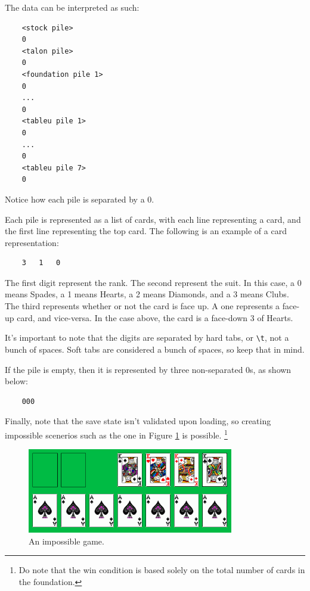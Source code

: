 \documentclass[12pt,a4paper,titlepage]{article}
\begin{document}
	The data can be interpreted as such:
	\begin{verbatim}
	<stock pile>
	0
	<talon pile>
	0
	<foundation pile 1>
	0
	...
	0
	<tableu pile 1>
	0
	...
	0
	<tableu pile 7>
	0
	\end{verbatim}
	Notice how each pile is separated by a 0.

	Each pile is represented as a list of cards, with each line representing
	a card, and the first line representing the top card. The following is an
	example of a card representation:
	\begin{verbatim}
	3	1	0
	\end{verbatim}

	The first digit represent the rank. The second represent the suit. In this
	case, a 0 means Spades, a 1 means Hearts, a 2 means Diamonds, and a 3 means
	Clubs. The third represents whether or not the card is face up. A one
	represents a face-up card, and vice-versa. In the case above, the card is
	a face-down 3 of Hearts.

	It's important to note that the digits are separated by hard tabs, or
	\verb|\t|, not a bunch of spaces. Soft tabs are considered a bunch of
	spaces, so keep that in mind.

	If the pile is empty, then it is represented by three non-separated 0s, as
	shown below:
	\begin{verbatim}
	000
	\end{verbatim}

	Finally, note that the save state isn't validated upon loading, so creating
	impossible scenerios such as the one in Figure \ref{fig:fig7} is possible.
	\footnote{Do note that the win condition is based solely on the total number
	of cards in the foundation.}

	\begin{figure}[H]
		\centering
		\captionsetup{justification=centering}
		\includegraphics[width=9cm]{images/fig7.png}
		\caption{An impossible game.}
		\label{fig:fig7}
	\end{figure}
\end{document}
